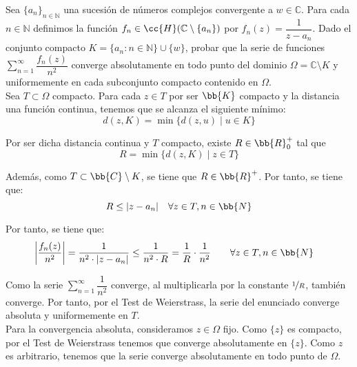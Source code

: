 \documentclass[12pt]{article}
\begin{document}
    \begin{ejercicio}[3 puntos]
        Sea $\{a_n\}_{n \in \mathbb{N}}$ una sucesión de números complejos convergente a $w \in \mathbb{C}$. Para cada $n \in \mathbb{N}$ definimos la función $f_n \in \cc{H}(\mathbb{C} \setminus \{a_n\})$ por $f_n(z) = \dfrac{1}{z - a_n}$. Dado el conjunto compacto $K = \{a_n : n \in \mathbb{N}\} \cup \{w\}$, probar que la serie de funciones $\displaystyle \sum_{n=1}^{\infty} \dfrac{f_n(z)}{n^2}$ converge absolutamente en todo punto del dominio $\Omega = \mathbb{C} \setminus K$ y uniformemente en cada subconjunto compacto contenido en $\Omega$.\\

        Sea $T\subset \Omega$ compacto. Para cada $z \in T$ por ser $\bb{K}$ compacto y la distancia una función continua, tenemos que se alcanza el siguiente mínimo:
        \begin{equation*}
            d(z, K) = \min \{d(z, u) \mid u \in K\}
        \end{equation*}

        Por ser dicha distancia continua y $T$ compacto, existe $R\in \bb{R}^+_0$ tal que
        \begin{equation*}
            R=\min \{d(z, K) \mid z \in T\}
        \end{equation*}

        Además, como $T\subset \bb{C}\setminus K$, se tiene que $R\in \bb{R}^+$. Por tanto, se tiene que:
        \begin{equation*}
            R\leq |z - a_n| \quad \forall z\in T, n\in \bb{N}
        \end{equation*}

        Por tanto, se tiene que:
        \begin{align*}
            \left|\dfrac{f_n(z)}{n^2}\right| &= \dfrac{1}{n^2\cdot |z - a_n|} \leq \dfrac{1}{n^2\cdot R} = \dfrac{1}{R}\cdot \dfrac{1}{n^2}\qquad \forall z\in T, n\in \bb{N}
        \end{align*}

        Como la serie $\displaystyle \sum_{n=1}^{\infty} \dfrac{1}{n^2}$ converge, al multiplicarla por la constante $\nicefrac{1}{R}$, también converge. Por tanto, por el Test de Weierstrass, la serie del enunciado converge absoluta y uniformemente en $T$.\\

        Para la convergencia absoluta, consideramos $z\in \Omega$ fijo. Como $\{z\}$ es compacto, por el Test de Weierstrass tenemos que converge absolutamente en $\{z\}$. Como $z$ es arbitrario, tenemos que la serie converge absolutamente en todo punto de $\Omega$.
    \end{ejercicio}
\end{document}
